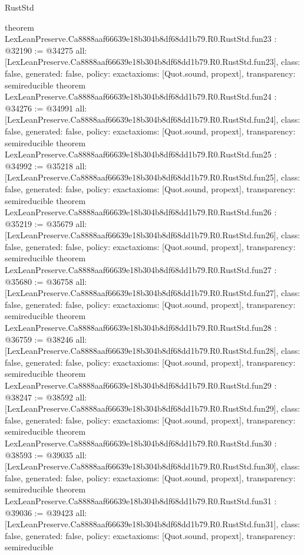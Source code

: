 \begin{lexlean}{RustStd}
\begin{coremodule}
{}
theorem LexLeanPreserve.Ca8888aaf66639e18b304b8df68dd1b79.R0.RustStd.fun23 : @32190 := @34275 {
  all: [LexLeanPreserve.Ca8888aaf66639e18b304b8df68dd1b79.R0.RustStd.fun23],
  class: false,
  generated: false,
  policy: exact{axioms: [Quot.sound, propext]},
  transparency: semireducible
}
theorem LexLeanPreserve.Ca8888aaf66639e18b304b8df68dd1b79.R0.RustStd.fun24 : @34276 := @34991 {
  all: [LexLeanPreserve.Ca8888aaf66639e18b304b8df68dd1b79.R0.RustStd.fun24],
  class: false,
  generated: false,
  policy: exact{axioms: [Quot.sound, propext]},
  transparency: semireducible
}
theorem LexLeanPreserve.Ca8888aaf66639e18b304b8df68dd1b79.R0.RustStd.fun25 : @34992 := @35218 {
  all: [LexLeanPreserve.Ca8888aaf66639e18b304b8df68dd1b79.R0.RustStd.fun25],
  class: false,
  generated: false,
  policy: exact{axioms: [Quot.sound, propext]},
  transparency: semireducible
}
theorem LexLeanPreserve.Ca8888aaf66639e18b304b8df68dd1b79.R0.RustStd.fun26 : @35219 := @35679 {
  all: [LexLeanPreserve.Ca8888aaf66639e18b304b8df68dd1b79.R0.RustStd.fun26],
  class: false,
  generated: false,
  policy: exact{axioms: [Quot.sound, propext]},
  transparency: semireducible
}
theorem LexLeanPreserve.Ca8888aaf66639e18b304b8df68dd1b79.R0.RustStd.fun27 : @35680 := @36758 {
  all: [LexLeanPreserve.Ca8888aaf66639e18b304b8df68dd1b79.R0.RustStd.fun27],
  class: false,
  generated: false,
  policy: exact{axioms: [Quot.sound, propext]},
  transparency: semireducible
}
theorem LexLeanPreserve.Ca8888aaf66639e18b304b8df68dd1b79.R0.RustStd.fun28 : @36759 := @38246 {
  all: [LexLeanPreserve.Ca8888aaf66639e18b304b8df68dd1b79.R0.RustStd.fun28],
  class: false,
  generated: false,
  policy: exact{axioms: [Quot.sound, propext]},
  transparency: semireducible
}
theorem LexLeanPreserve.Ca8888aaf66639e18b304b8df68dd1b79.R0.RustStd.fun29 : @38247 := @38592 {
  all: [LexLeanPreserve.Ca8888aaf66639e18b304b8df68dd1b79.R0.RustStd.fun29],
  class: false,
  generated: false,
  policy: exact{axioms: [Quot.sound, propext]},
  transparency: semireducible
}
theorem LexLeanPreserve.Ca8888aaf66639e18b304b8df68dd1b79.R0.RustStd.fun30 : @38593 := @39035 {
  all: [LexLeanPreserve.Ca8888aaf66639e18b304b8df68dd1b79.R0.RustStd.fun30],
  class: false,
  generated: false,
  policy: exact{axioms: [Quot.sound, propext]},
  transparency: semireducible
}
theorem LexLeanPreserve.Ca8888aaf66639e18b304b8df68dd1b79.R0.RustStd.fun31 : @39036 := @39423 {
  all: [LexLeanPreserve.Ca8888aaf66639e18b304b8df68dd1b79.R0.RustStd.fun31],
  class: false,
  generated: false,
  policy: exact{axioms: [Quot.sound, propext]},
  transparency: semireducible
}
\end{coremodule}
\end{lexlean}
